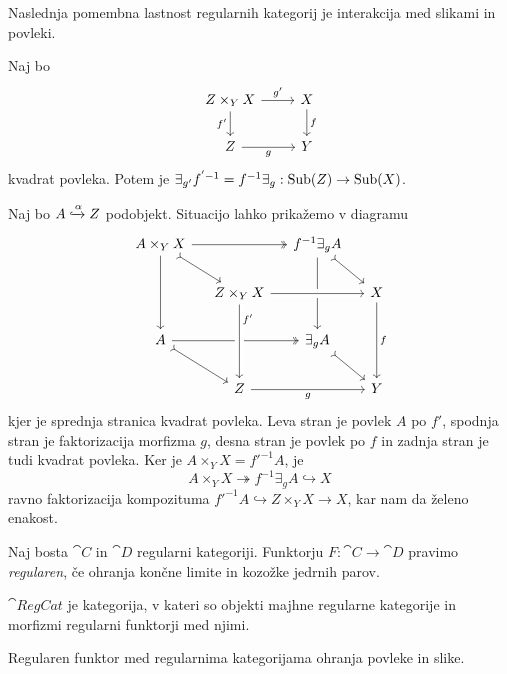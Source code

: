 \documentclass[../kategoricna_logika.tex]{subfiles}
\begin{document}
Naslednja pomembna lastnost regularnih kategorij je interakcija med
slikami in povleki.
\begin{lema}\label{lema:zamenjava-povleka-in-slike}
  Naj bo
  \begin{equation*}
    \begin{tikzcd}
      Z \times_Y X \ar[d, "f'"'] \ar[r, "g'"] & X \ar[d, "f"] \\
      Z \ar[r, "g"'] & Y
    \end{tikzcd}
  \end{equation*}
  kvadrat povleka. Potem je $\exists_{g'}f^{'-1} = f^{-1}\exists_g : \operatorname{Sub}(Z) \to \operatorname{Sub}(X)$.
\end{lema}
\begin{dokaz}
  Naj bo $A \xhookrightarrow{\alpha} Z$ podobjekt.  Situacijo lahko
  prikažemo v diagramu
  \begin{equation*}
    \begin{tikzcd}[column sep=small]
      A \times_Y X \ar[dd] \ar[dr, tail] \ar[rr, two heads] & &
      f^{-1}\exists_g A \ar[dd] \ar[dr, tail] & \\
      & Z \times_Y X  \ar[rr, crossing over] & & X \ar[dd, "f"] \\
      A \ar[dr, tail] \ar[rr, two heads] & & \exists_g A \ar[dr, tail] & \\
      & Z \ar[rr, "g"'] \ar[from=uu, pos=0.2, crossing over, "f'"] & &
      Y
    \end{tikzcd}
  \end{equation*}
  kjer je sprednja stranica kvadrat povleka.  Leva stran je povlek $A$
  po $f'$, spodnja stran je faktorizacija morfizma $g$, desna stran je
  povlek po $f$ in zadnja stran je tudi kvadrat povleka.  Ker je
  $A \times_Y X = f'^{-1}A$, je
  \[A \times_Y X \twoheadrightarrow f^{-1}\exists_g A \hookrightarrow
    X\] ravno faktorizacija kompozituma
  $f'^{-1}A \hookrightarrow Z \times_Y X \to X$, kar nam da želeno
  enakost.
\end{dokaz}
\begin{definicija}
  Naj bosta $\cat{C}$ in $\cat{D}$ regularni kategoriji.  Funktorju
  ${F : \cat{C} \to \cat{D}}$ pravimo \emph{regularen}, če ohranja
  končne limite in kozožke jedrnih parov.
\end{definicija}
\begin{definicija}
  $\cat{RegCat}$ je kategorija, v kateri so objekti majhne regularne
  kategorije in morfizmi regularni funktorji med njimi.
\end{definicija}
\begin{lema}
  Regularen funktor med regularnima kategorijama ohranja povleke in
  slike.
\end{lema}
\end{document}
